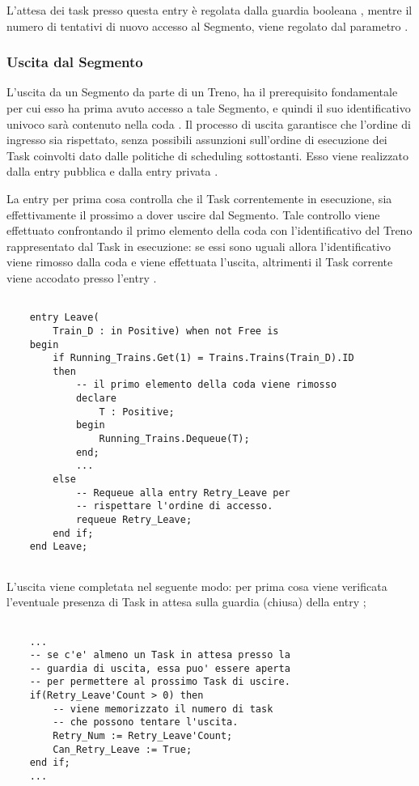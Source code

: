 	L'attesa dei task presso questa entry è regolata dalla guardia booleana , mentre il numero di tentativi di nuovo accesso al Segmento, viene regolato dal parametro .
	
	\subsubsection{Uscita dal Segmento}
	
	L'uscita da un Segmento da parte di un Treno, ha il prerequisito fondamentale per cui esso ha prima avuto accesso a tale Segmento, e quindi il suo identificativo univoco sarà contenuto nella coda .
	Il processo di uscita garantisce che l'ordine di ingresso sia rispettato, senza possibili assunzioni sull'ordine di esecuzione dei Task coinvolti dato dalle politiche di scheduling sottostanti.
	Esso viene realizzato dalla entry pubblica  e dalla entry privata .
	
	La entry  per prima cosa controlla che il Task correntemente in esecuzione, sia effettivamente il prossimo a dover uscire dal Segmento. Tale controllo viene effettuato confrontando il primo elemento della coda  con l'identificativo del Treno rappresentato dal Task in esecuzione: se essi sono uguali allora l'identificativo viene rimosso dalla coda e viene effettuata l'uscita, altrimenti il Task corrente viene accodato presso l'entry .
	
\begin{lstlisting}
	
	entry Leave(
		Train_D : in Positive) when not Free is
	begin
		if Running_Trains.Get(1) = Trains.Trains(Train_D).ID 
		then
			-- il primo elemento della coda viene rimosso
			declare
				T : Positive;
			begin
				Running_Trains.Dequeue(T);
			end;
			...
		else
			-- Requeue alla entry Retry_Leave per
			-- rispettare l'ordine di accesso.
			requeue Retry_Leave;
		end if;
	end Leave;
		
\end{lstlisting}
	 
	L'uscita viene completata nel seguente modo: per prima cosa viene verificata l'eventuale presenza di Task in attesa sulla guardia (chiusa) della entry ;
	
\begin{lstlisting}
	
	...
	-- se c'e' almeno un Task in attesa presso la
	-- guardia di uscita, essa puo' essere aperta
	-- per permettere al prossimo Task di uscire.
	if(Retry_Leave'Count > 0) then
		-- viene memorizzato il numero di task
		-- che possono tentare l'uscita.
		Retry_Num := Retry_Leave'Count;
		Can_Retry_Leave := True;
	end if;
	...
	
\end{lstlisting}
	
